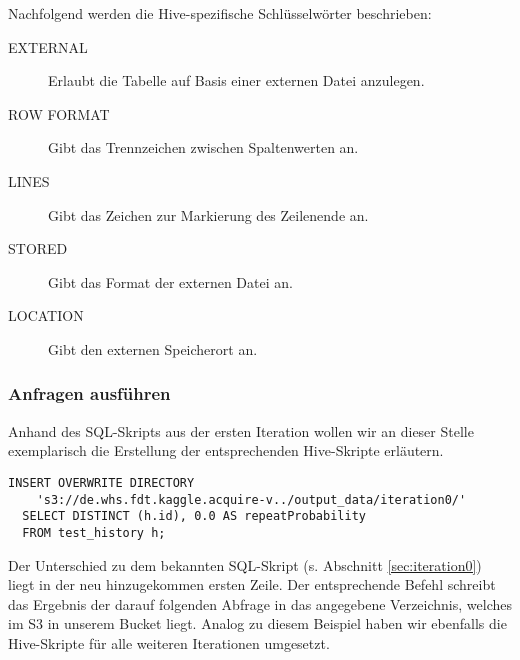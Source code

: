 Nachfolgend werden die Hive-spezifische Schlüsselwörter beschrieben:
\begin{description}
\item[EXTERNAL] Erlaubt die Tabelle auf Basis einer externen Datei anzulegen.
\item[ROW FORMAT] Gibt das Trennzeichen zwischen Spaltenwerten an.
\item[LINES] Gibt das Zeichen zur Markierung des Zeilenende an.
\item[STORED] Gibt das Format der externen Datei an.
\item[LOCATION] Gibt den externen Speicherort an.
\end{description}

\subsubsection{Anfragen ausführen}
Anhand des SQL-Skripts aus der ersten Iteration wollen wir an dieser Stelle exemplarisch die Erstellung der entsprechenden Hive-Skripte erläutern.

\begin{lstlisting}[style=hive]
INSERT OVERWRITE DIRECTORY
    's3://de.whs.fdt.kaggle.acquire-v../output_data/iteration0/'
  SELECT DISTINCT (h.id), 0.0 AS repeatProbability
  FROM test_history h;
\end{lstlisting}

Der Unterschied zu dem bekannten SQL-Skript (s. Abschnitt \ref{sec:iteration0}) liegt in der neu hinzugekommen ersten Zeile. Der entsprechende Befehl schreibt das Ergebnis der darauf folgenden Abfrage in das angegebene Verzeichnis, welches im S3 in unserem Bucket liegt. Analog zu diesem Beispiel haben wir ebenfalls die Hive-Skripte für alle weiteren Iterationen umgesetzt.

  


